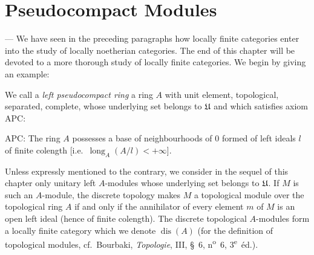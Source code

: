 %
%

\section{Pseudocompact Modules}

--- We have seen in the preceding paragraphs how locally finite
categories enter into the study of locally noetherian categories. The
end of this chapter will be devoted to a more thorough study of
locally finite categories. We begin by giving an example:

We call a \emph{left pseudocompact ring} a ring $A$ with unit element,
topological, separated, complete, whose underlying set belongs to
$\mathfrak{U}$ and which satisfies axiom APC:

APC: The ring $A$ possesses a base of neighbourhoods of $0$ formed of
left ideals $l$ of finite colength [i.e.\
$\operatorname{long}_A(A/l)<+\infty$].

Unless expressly mentioned to the contrary, we consider in the sequel
of this chapter only unitary left $A$-modules whose underlying set
belongs to $\mathfrak{U}$. If $M$ is such an $A$-module, the discrete topology
makes $M$ a topological module over the topological ring $A$ if and
only if the annihilator of every element $m$ of $M$ is an open left
ideal (hence of finite colength). The discrete topological $A$-modules
form a locally finite category which we denote
$\operatorname{dis}(A)$ (for the definition of topological modules,
cf.\ Bourbaki, \emph{Topologie}, III, \S~6, n\textsuperscript{o}~6,
3\textsuperscript{e}~éd.).

